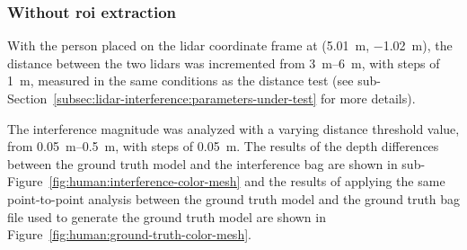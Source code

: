 \subsubsection{Without \ac{roi} extraction}
With the person placed on the \ac{lidar} coordinate frame at (\SI{5.01}{\meter}, \SI{-1.02}{\meter}), the distance between the two \acp{lidar} was incremented from \SIrange{3}{6}{\meter}, with steps of \SI{1}{\meter}, measured in the same conditions as the distance test (see sub-Section~\ref{subsec:lidar-interference:parameters-under-test} for more details). 

The interference magnitude was analyzed with a varying distance threshold value, from \SIrange{0.05}{0.5}{\meter}, with steps of \SI{0.05}{\meter}. The results of the depth differences between the ground truth model and the interference bag are shown in sub-Figure~\ref{fig:human:interference-color-mesh} and the results of applying the same point-to-point analysis between the ground truth model and the ground truth bag file used to generate the ground truth model are shown in Figure~\ref{fig:human:ground-truth-color-mesh}.


